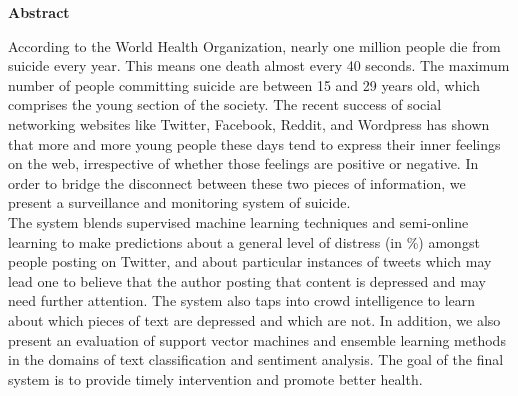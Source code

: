 
\clearemptydoublepage
{}
{}

\vspace*{2cm}
\begin{center}
{\Large \bf Abstract}
\end{center}
\vspace{1cm}

According to the World Health Organization, nearly one million people die from suicide every year. This means one death almost every 40 seconds. The maximum number of people committing suicide are between 15 and 29 years old, which comprises the young section of the society. The recent success of social networking websites like Twitter, Facebook, Reddit, and Wordpress has shown that more and more young people these days tend to express their inner feelings on the web, irrespective of whether those feelings are positive or negative. In order to bridge the disconnect between these two pieces of information, we present a surveillance and monitoring system of suicide.\\

The system blends supervised machine learning techniques and semi-online learning to make predictions about a general level of distress (in \%) amongst people posting on Twitter, and about particular instances of tweets which may lead one to believe that the author posting that content is depressed and may need further attention. The system also taps into crowd intelligence to learn about which pieces of text are depressed and which are not. In addition, we also present an evaluation of support vector machines and ensemble learning methods in the domains of text classification and sentiment analysis. The goal of the final system is to provide timely intervention and promote better health.
